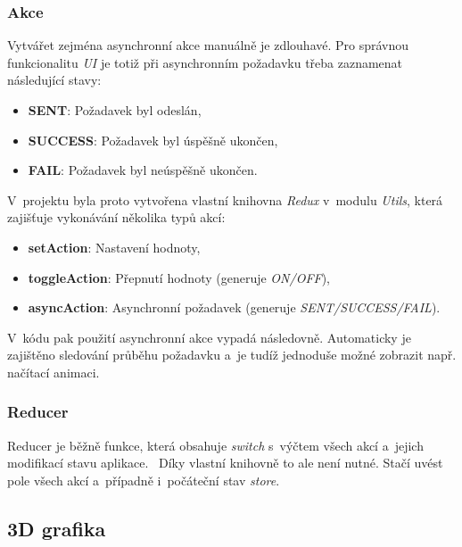 \documentclass[a4paper,12pt]{article}
\begin{document}
\subsubsection{Akce}

Vytvářet zejména asynchronní akce manuálně je zdlouhavé. Pro správnou funkcionalitu \textit{UI} je totiž při asynchronním požadavku třeba zaznamenat následující stavy:

\begin{itemize}
\item \textbf{SENT}: Požadavek byl odeslán,
\item \textbf{SUCCESS}: Požadavek byl úspěšně ukončen,
\item \textbf{FAIL}: Požadavek byl neúspěšně ukončen.
\end{itemize}

V~projektu byla proto vytvořena vlastní knihovna \textit{Redux} v~modulu \textit{Utils}, která zajišťuje vykonávání několika typů akcí:

\begin{itemize}
\item \textbf{setAction}: Nastavení hodnoty,
\item \textbf{toggleAction}: Přepnutí hodnoty (generuje \textit{ON/OFF}),
\item \textbf{asyncAction}: Asynchronní požadavek (generuje \textit{SENT/SUCCESS/FAIL}).
\end{itemize}

V~kódu pak použití asynchronní akce vypadá následovně. Automaticky je zajištěno sledování průběhu požadavku a~je tudíž jednoduše možné zobrazit např. načítací animaci.



\subsubsection{Reducer}

Reducer je běžně funkce, která obsahuje \textit{switch} s~výčtem všech akcí a~jejich modifikací stavu aplikace.~\cite{reactbook} Díky vlastní knihovně to ale není nutné. Stačí uvést pole všech akcí a~případně i~počáteční stav \textit{store}.



\subsection{3D grafika}
\end{document}
